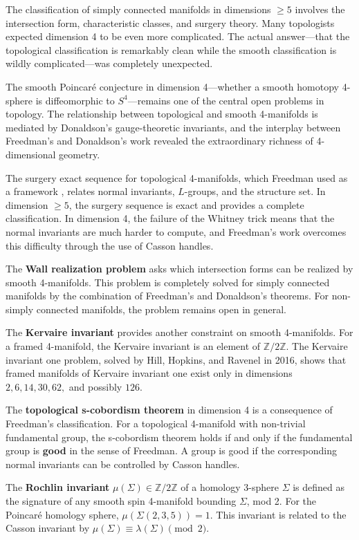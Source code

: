 The classification of simply connected manifolds in dimensions $\geq 5$ involves the intersection form, characteristic classes, and surgery theory. Many topologists expected dimension 4 to be even more complicated. The actual answer---that the topological classification is remarkably clean while the smooth classification is wildly complicated---was completely unexpected.

The smooth Poincar\'e conjecture in dimension 4---whether a smooth homotopy 4-sphere is diffeomorphic to $S^4$---remains one of the central open problems in topology. The relationship between topological and smooth 4-manifolds is mediated by Donaldson's gauge-theoretic invariants, and the interplay between Freedman's and Donaldson's work revealed the extraordinary richness of 4-dimensional geometry.

The surgery exact sequence for topological 4-manifolds, which Freedman used as a framework \cite{freedman1982}, relates normal invariants, $L$-groups, and the structure set. In dimension $\geq 5$, the surgery sequence is exact and provides a complete classification. In dimension 4, the failure of the Whitney trick means that the normal invariants are much harder to compute, and Freedman's work overcomes this difficulty through the use of Casson handles.

The \textbf{Wall realization problem} asks which intersection forms can be realized by smooth 4-manifolds. This problem is completely solved for simply connected manifolds by the combination of Freedman's and Donaldson's theorems. For non-simply connected manifolds, the problem remains open in general.

The \textbf{Kervaire invariant} provides another constraint on smooth 4-manifolds. For a framed 4-manifold, the Kervaire invariant is an element of $\mathbb{Z}/2\mathbb{Z}$. The Kervaire invariant one problem, solved by Hill, Hopkins, and Ravenel in 2016, shows that framed manifolds of Kervaire invariant one exist only in dimensions $2, 6, 14, 30, 62,$ and possibly $126$.

The \textbf{topological s-cobordism theorem} in dimension 4 is a consequence of Freedman's classification. For a topological 4-manifold with non-trivial fundamental group, the s-cobordism theorem holds if and only if the fundamental group is \textbf{good} in the sense of Freedman. A group is good if the corresponding normal invariants can be controlled by Casson handles.

The \textbf{Rochlin invariant} $\mu(\Sigma) \in \mathbb{Z}/2\mathbb{Z}$ of a homology 3-sphere $\Sigma$ is defined as the signature of any smooth spin 4-manifold bounding $\Sigma$, mod 2. For the Poincaré homology sphere, $\mu(\Sigma(2,3,5)) = 1$. This invariant is related to the Casson invariant by $\mu(\Sigma) \equiv \lambda(\Sigma) \pmod{2}$.

